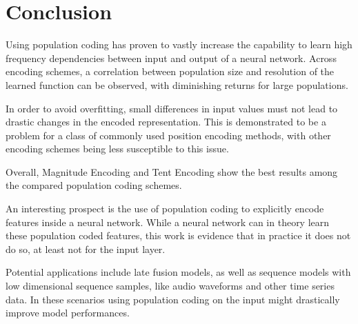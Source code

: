 \section{Conclusion}

Using population coding has proven to vastly increase the capability to learn high frequency dependencies between input and output of a neural network. Across encoding schemes, a correlation between population size and resolution of the learned function can be observed, with diminishing returns for large populations. 

In order to avoid overfitting, small differences in input values must not lead to drastic changes in the encoded representation. This is demonstrated to be a problem for a class of commonly used position encoding methods, with other encoding schemes being less susceptible to this issue. 

Overall, Magnitude Encoding and Tent Encoding show the best results among the compared population coding schemes. 

An interesting prospect is the use of population coding to explicitly encode features inside a neural network. While a neural network can in theory learn these population coded features, this work is evidence that in practice it does not do so, at least not for the input layer.

Potential applications include late fusion models, as well as sequence models with low dimensional sequence samples, like audio waveforms and other time series data. In these scenarios using population coding on the input might drastically improve model performances.